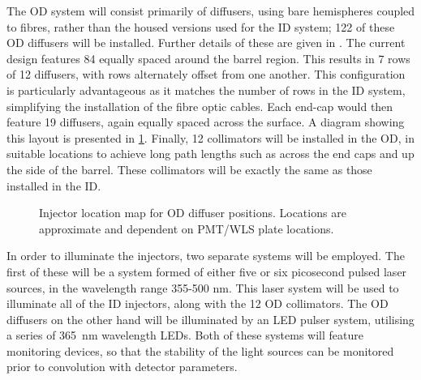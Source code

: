 \documentclass[a4paper,11pt]{article}
\begin{document}
The OD system will consist primarily of diffusers, using bare hemispheres coupled to fibres, rather than the housed versions used for the ID system; 122 of these OD diffusers will be installed. Further details of these are given in \cite{bib:tn0111}. The current design features 84 equally spaced around the barrel region. This results in 7 rows of 12 diffusers, with rows alternately offset from one another. This configuration is particularly advantageous as it matches the number of rows in the ID system, simplifying the installation of the fibre optic cables. Each end-cap would then feature 19 diffusers, again equally spaced across the surface. A diagram showing this layout is presented in \cref{fig:ODdiffmap}. Finally, 12 collimators will be installed in the OD, in suitable locations to achieve long path lengths such as across the end caps and up the side of the barrel. These collimators will be exactly the same as those installed in the ID.

\begin{figure}[h!]
\centering
{}
\caption{Injector location map for OD diffuser positions. Locations are approximate and dependent on PMT/WLS plate locations.}\label{fig:ODdiffmap}
\end{figure}

In order to illuminate the injectors, two separate systems will be employed. The first of these will be a system formed of either five or six picosecond pulsed laser sources, in the wavelength range 355-500 nm. This laser system will be used to illuminate all of the ID injectors, along with the 12 OD collimators. The OD diffusers on the other hand will be illuminated by an LED pulser system, utilising a series of 365~nm wavelength LEDs. Both of these systems will feature monitoring devices, so that the stability of the light sources can be monitored prior to convolution with detector parameters.
\end{document}
